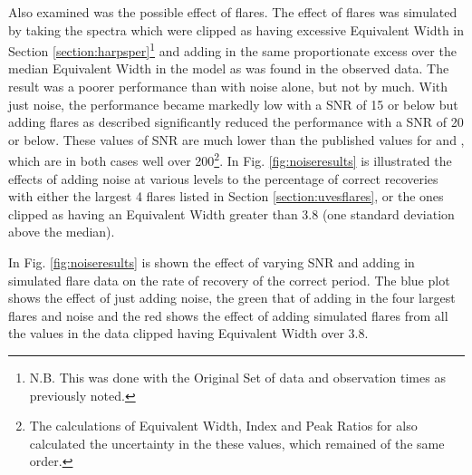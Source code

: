 Also examined was the possible effect of flares. The effect of flares was simulated by taking the spectra
which were clipped as having excessive Equivalent Width in Section \ref{section:harpsper}\footnote{N.B. This was done
  with the Original Set of data and observation times as previously noted.} and adding in the same
proportionate excess over the median Equivalent Width in the model as was found in the observed data. The result was a
poorer performance than with noise alone, but not by much. With just noise, the performance became markedly low with a
SNR of 15 or below but adding flares as described significantly reduced the performance with a SNR of 20 or below. These
values of SNR are much lower than the published values for {\uves} and {\harps}, which are in both cases well over
200\footnote{The calculations of Equivalent Width, {\ha} Index and Peak Ratios for {\harps} also calculated the
  uncertainty in the these values, which remained of the same order.}. In Fig. \ref{fig:noiseresults} is illustrated the
effects of adding noise at various levels to the percentage of correct recoveries with either the largest 4 flares
listed in Section \ref{section:uvesflares}, or the ones clipped as having an Equivalent Width greater than 3.8 (one
standard deviation above the median).

In Fig. \ref{fig:noiseresults} is shown the effect of varying SNR and adding in simulated flare data on the rate of
recovery of the correct period. The blue plot shows the effect of just adding noise, the green that of adding in the
four largest flares and noise and the red shows the effect of adding simulated flares from all the values in the
{\harps} data clipped having Equivalent Width over 3.8.

